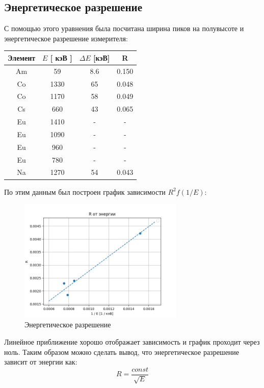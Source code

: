 \documentclass[a4paper,12pt]{article} %
\begin{document}
		\subsection*{Энергетическое разрешение}	
			С помощью этого уравнения была посчитана ширина пиков на полувысоте и энергетическое разрешение измерителя:
			\begin{table}[h]
				\centering
				\begin{tabular}{|c|c|c|c|}
				\hline
				Элемент & $E$  [ кэВ ]  & $\Delta E$ [кэВ]     & R     \\ \hline
				Am      & 59            & 8.6                   & 0.150 \\ \hline
				Co      & 1330          & 65                    & 0.048 \\ \hline
				Co      & 1170          & 58                    & 0.049 \\ \hline
				Cs      & 660           & 43                    & 0.065 \\ \hline
				Eu      & 1410          & -                     & -     \\ \hline
				Eu      & 1090          & -                     & -     \\ \hline
				Eu      & 960           & -                     & -     \\ \hline
				Eu      & 780           & -                     & -     \\ \hline
				Na      & 1270          & 54                    & 0.043 \\ \hline
				\end{tabular}
			\end{table}\par
			По этим данным был построен график зависимости $R^2 f(1 / E)$:
			\begin{figure}[h!]
				\includegraphics[width=0.7\textwidth]{img/R.png}
				\centering
				\caption{Энергетическое разрешение}
			\end{figure}\par
			Линейное приближение хорошо отображает зависимость и график проходит через ноль.
			Таким образом можно сделать вывод, что энергетическое разрешение зависит от энергии как:
			\begin{equation}
				R = \frac{const}{\sqrt{E}}
			\end{equation}
	\newpage
\end{document}
